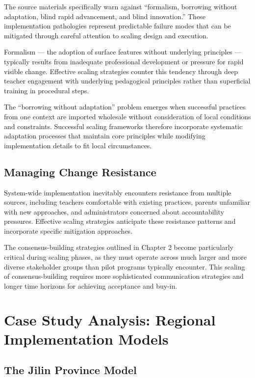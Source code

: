 \documentclass[
  Letterpaper,
]{scrbook}
\begin{document}
The source materials specifically warn against ``formalism, borrowing
without adaptation, blind rapid advancement, and blind innovation.''
These implementation pathologies represent predictable failure modes
that can be mitigated through careful attention to scaling design and
execution.

Formalism --- the adoption of surface features without underlying
principles --- typically results from inadequate professional
development or pressure for rapid visible change. Effective scaling
strategies counter this tendency through deep teacher engagement with
underlying pedagogical principles rather than superficial training in
procedural steps.

The ``borrowing without adaptation'' problem emerges when successful
practices from one context are imported wholesale without consideration
of local conditions and constraints. Successful scaling frameworks
therefore incorporate systematic adaptation processes that maintain core
principles while modifying implementation details to fit local
circumstances.

\subsection{Managing Change
Resistance}\label{managing-change-resistance}

System-wide implementation inevitably encounters resistance from
multiple sources, including teachers comfortable with existing
practices, parents unfamiliar with new approaches, and administrators
concerned about accountability pressures. Effective scaling strategies
anticipate these resistance patterns and incorporate specific mitigation
approaches.

The consensus-building strategies outlined in Chapter 2 become
particularly critical during scaling phases, as they must operate across
much larger and more diverse stakeholder groups than pilot programs
typically encounter. This scaling of consensus-building requires more
sophisticated communication strategies and longer time horizons for
achieving acceptance and buy-in.

\section{Case Study Analysis: Regional Implementation
Models}\label{case-study-analysis-regional-implementation-models}

\subsection{The Jilin Province Model}\label{the-jilin-province-model}
\end{document}
